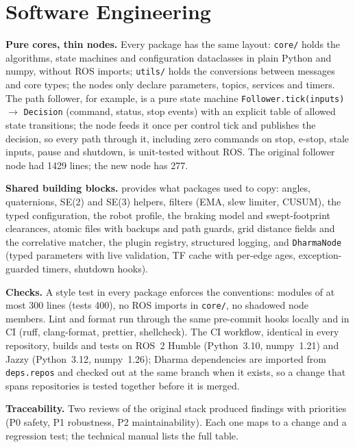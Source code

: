 \section{Software Engineering}
\label{sec:eng}

\textbf{Pure cores, thin nodes.} Every package has the same layout: \texttt{core/} holds the
algorithms, state machines and configuration dataclasses in plain Python and numpy, without
ROS imports; \texttt{utils/} holds the conversions between messages and core types; the nodes
only declare parameters, topics, services and timers. The path follower, for example, is a pure
state machine \texttt{Follower.tick(inputs)} $\to$ \texttt{Decision} (command, status, stop
events) with an explicit table of allowed state transitions; the node feeds it once per control
tick and publishes the decision, so every path through it, including zero commands on stop,
e-stop, stale inputs, pause and shutdown, is unit-tested without ROS. The original follower
node had 1429 lines; the new node has 277.

\textbf{Shared building blocks.}  provides what packages used to copy:
angles, quaternions, SE(2) and SE(3) helpers, filters (EMA, slew limiter, CUSUM), the typed
configuration, the robot profile, the braking model and swept-footprint clearances, atomic
files with backups and path guards, grid distance fields and the correlative matcher, the plugin
registry, structured logging, and \texttt{DharmaNode} (typed parameters with live validation,
TF cache with per-edge ages, exception-guarded timers, shutdown hooks).

\textbf{Checks.} A style test in every package enforces the conventions: modules of at most 300
lines (tests 400), no ROS imports in \texttt{core/}, no shadowed node members. Lint and format
run through the same pre-commit hooks locally and in CI (ruff, clang-format, prettier,
shellcheck). The CI workflow, identical in every repository, builds and tests on ROS~2 Humble
(Python~3.10, numpy~1.21) and Jazzy (Python~3.12, numpy~1.26); Dharma dependencies are
imported from \texttt{deps.repos} and checked out at the same branch when it exists, so a
change that spans repositories is tested together before it is merged.

\textbf{Traceability.} Two reviews of the original stack produced findings with priorities
(P0 safety, P1 robustness, P2 maintainability). Each one maps to a change and a regression test;
the technical manual lists the full table.


